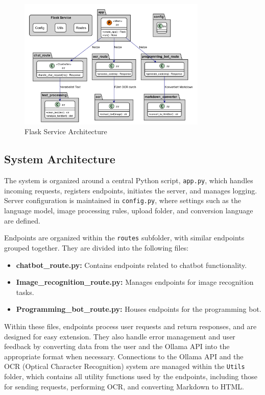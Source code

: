 \begin{figure}[h]
    \centering
    \includegraphics[width=0.8\textwidth]{figures/flask_service.png}
    \caption{Flask Service Architecture}
    \label{fig:flask_service_architecture}
\end{figure}

\subsection{System Architecture}

The system is organized around a central Python script, \texttt{app.py}, which handles incoming requests, registers endpoints, initiates the server, and manages logging. Server configuration is maintained in \texttt{config.py}, where settings such as the language model, image processing rules, upload folder, and conversion language are defined.

Endpoints are organized within the \texttt{routes} subfolder, with similar endpoints grouped together. They are divided into the following files:
\begin{itemize}
    \item \textbf{chatbot\_route.py:} Contains endpoints related to chatbot functionality.
    \item \textbf{Image\_recognition\_route.py:} Manages endpoints for image recognition tasks.
    \item \textbf{Programming\_bot\_route.py:} Houses endpoints for the programming bot.
\end{itemize}

Within these files, endpoints process user requests and return responses, and are designed for easy extension. They also handle error management and user feedback by converting data from the user and the Ollama API into the appropriate format when necessary. Connections to the Ollama API and the OCR (Optical Character Recognition) system are managed within the \texttt{Utils} folder, which contains all utility functions used by the endpoints, including those for sending requests, performing OCR, and converting Markdown to HTML.

